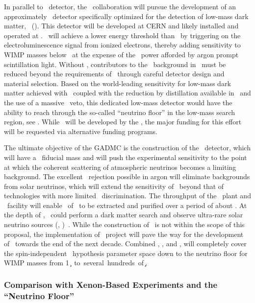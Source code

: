 In parallel to \DSks\ detector, the \GADMC\ collaboration will pursue the development of an approximately \DSlApproxMassScale\ detector specifically optimized for the detection of low-mass dark matter, \DSl\ (\DSls). This detector will be developed at CERN and likely installed and operated at \LNGS. \DSls\ will achieve a lower energy threshold than \DSks\ by triggering on the electroluminescence signal from ionized electrons, thereby adding sensitivity to WIMP masses below \DSlLowMassThreshold\ at the expense of the \PSD\ power afforded by argon prompt scintillation light. Without \PSD, contributors to the \ER\ background in \DSls\ must be reduced beyond the requirements of \DSks\ through careful detector design and material selection.  Based on the world-leading sensitivity for low-mass dark matter achieved with \DSfs\ coupled with the  reduction by distillation available in \Aria\ and the use of a massive \AAr\ veto, this dedicated low-mass detector would have the ability to reach through the so-called ``neutrino floor'' in the low-mass search region, see . While \DSls\ will be developed by the \GADMC, the major funding for this effort will be requested via alternative funding programs.

The ultimate objective of the GADMC is the construction of the \Argo\ detector, which will have a \GADMCFiducialMass\ fiducial mass and will push the experimental sensitivity to the point at which the coherent scattering of atmospheric neutrinos becomes a limiting background. The excellent \ER\ rejection possible in argon will eliminate backgrounds from solar neutrinos, which will extend the sensitivity of \Argo\ beyond that of technologies with more limited \ER\ discrimination. The throughput  of the \Urania\ plant and \Aria\ facility will enable \ArgoTotalMass\ of \UAr\ to be extracted and purified over a period of about \ArgoExtractionPeriod.  At the depth of \SNOLAB, \Argo\ could perform a dark matter search and observe ultra-rare solar neutrino sources (\CNO, \HEP)~\cite{Franco:2016ex}.  While the construction of \Argo\ is not within the scope of this proposal, the implementation of  \DSk\ project will pave the way for the development of \Argo\ towards the end of the next decade. Combined \DSks, \DSls, and \Argo, will completely cover the spin-independent \WIMP\ hypothesis parameter space down to the neutrino floor for WIMP masses from \SI{1}{\GeV\per\square\c} to several hundreds of \si{\TeV\per\square\c}.


\subsubsection{Comparison with Xenon-Based Experiments and the ``Neutrino Floor''}

